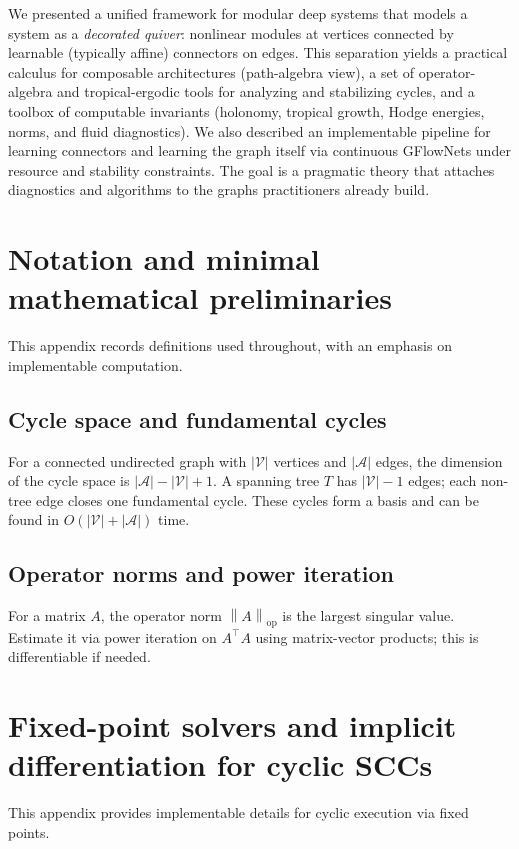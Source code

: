 \documentclass[11pt]{article}
\theoremstyle{definition}
\theoremstyle{plain}
\theoremstyle{remark}
\newcommand{\opnorm}[1]{\left\lVert #1 \right\rVert_{\mathrm{op}}}
\newcommand{\mc}[1]{\mathcal{#1}}
\newcommand{\Nodes}{\mc{V}}
\newcommand{\Edges}{\mc{A}}
\begin{document}
We presented a unified framework for modular deep systems that models a system as a \emph{decorated quiver}: nonlinear modules at vertices connected by learnable (typically affine) connectors on edges.
This separation yields a practical calculus for composable architectures (path-algebra view), a set of operator-algebra and tropical-ergodic tools for analyzing and stabilizing cycles, and a toolbox of computable invariants (holonomy, tropical growth, Hodge energies, norms, and fluid diagnostics).
We also described an implementable pipeline for learning connectors and learning the graph itself via continuous GFlowNets under resource and stability constraints.
The goal is a pragmatic theory that attaches diagnostics and algorithms to the graphs practitioners already build.

\appendix

\section{Notation and minimal mathematical preliminaries}
\label{app:prelims}

This appendix records definitions used throughout, with an emphasis on implementable computation.

\subsection{Cycle space and fundamental cycles}
For a connected undirected graph with $|\Nodes|$ vertices and $|\Edges|$ edges, the dimension of the cycle space is $|\Edges|-|\Nodes|+1$.
A spanning tree $T$ has $|\Nodes|-1$ edges; each non-tree edge closes one fundamental cycle.
These cycles form a basis and can be found in $O(|\Nodes|+|\Edges|)$ time.

\subsection{Operator norms and power iteration}
For a matrix $A$, the operator norm $\opnorm{A}$ is the largest singular value.
Estimate it via power iteration on $A^\top A$ using matrix-vector products; this is differentiable if needed.

\section{Fixed-point solvers and implicit differentiation for cyclic SCCs}
\label{app:fixed-point}

This appendix provides implementable details for cyclic execution via fixed points.
\end{document}
